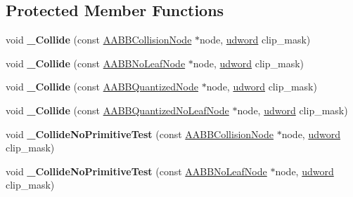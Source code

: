 \subsection*{Protected Member Functions}
\begin{DoxyCompactItemize}
\item 
void {\bfseries \+\_\+\+Collide} (const \hyperlink{classAABBCollisionNode}{A\+A\+B\+B\+Collision\+Node} $\ast$node, \hyperlink{IceTypes_8h_a44c6f1920ba5551225fb534f9d1a1733}{udword} clip\+\_\+mask)\hypertarget{classPlanesCollider_afe02fe2d147e793bbeab7a9eb89bed2b}{}\label{classPlanesCollider_afe02fe2d147e793bbeab7a9eb89bed2b}

\item 
void {\bfseries \+\_\+\+Collide} (const \hyperlink{classAABBNoLeafNode}{A\+A\+B\+B\+No\+Leaf\+Node} $\ast$node, \hyperlink{IceTypes_8h_a44c6f1920ba5551225fb534f9d1a1733}{udword} clip\+\_\+mask)\hypertarget{classPlanesCollider_a2fe298e87efaba35deff6e4ad7a56da0}{}\label{classPlanesCollider_a2fe298e87efaba35deff6e4ad7a56da0}

\item 
void {\bfseries \+\_\+\+Collide} (const \hyperlink{classAABBQuantizedNode}{A\+A\+B\+B\+Quantized\+Node} $\ast$node, \hyperlink{IceTypes_8h_a44c6f1920ba5551225fb534f9d1a1733}{udword} clip\+\_\+mask)\hypertarget{classPlanesCollider_a405bf739ddac7a191edee9a8e438bc8a}{}\label{classPlanesCollider_a405bf739ddac7a191edee9a8e438bc8a}

\item 
void {\bfseries \+\_\+\+Collide} (const \hyperlink{classAABBQuantizedNoLeafNode}{A\+A\+B\+B\+Quantized\+No\+Leaf\+Node} $\ast$node, \hyperlink{IceTypes_8h_a44c6f1920ba5551225fb534f9d1a1733}{udword} clip\+\_\+mask)\hypertarget{classPlanesCollider_aface806a10833333a7e0473d7b30767b}{}\label{classPlanesCollider_aface806a10833333a7e0473d7b30767b}

\item 
void {\bfseries \+\_\+\+Collide\+No\+Primitive\+Test} (const \hyperlink{classAABBCollisionNode}{A\+A\+B\+B\+Collision\+Node} $\ast$node, \hyperlink{IceTypes_8h_a44c6f1920ba5551225fb534f9d1a1733}{udword} clip\+\_\+mask)\hypertarget{classPlanesCollider_ac449d61fe5762a288103ec40c8bf72ce}{}\label{classPlanesCollider_ac449d61fe5762a288103ec40c8bf72ce}

\item 
void {\bfseries \+\_\+\+Collide\+No\+Primitive\+Test} (const \hyperlink{classAABBNoLeafNode}{A\+A\+B\+B\+No\+Leaf\+Node} $\ast$node, \hyperlink{IceTypes_8h_a44c6f1920ba5551225fb534f9d1a1733}{udword} clip\+\_\+mask)\hypertarget{classPlanesCollider_a63ae4b22dbfe779be74ca3bd60dd512a}{}\label{classPlanesCollider_a63ae4b22dbfe779be74ca3bd60dd512a}


\end{DoxyCompactItemize}
